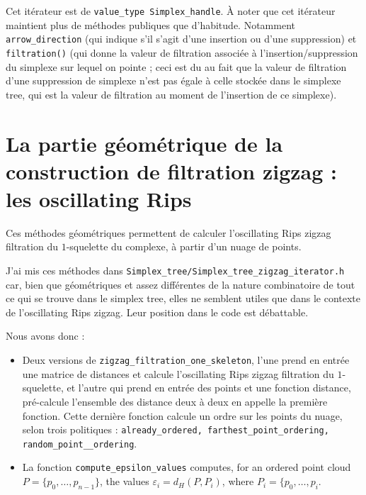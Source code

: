 \documentclass[11pt]{amsart}
\numberwithin{equation}{section}
\theoremstyle{plain}
\theoremstyle{definition}
\begin{document}
\begin{itemize}
\begin{itemize}
\smallskip

Cet itérateur est de {\tt value\_type Simplex\_handle}. À noter que cet itérateur maintient plus de méthodes publiques que d'habitude. Notamment {\tt arrow\_direction} (qui indique s'il s'agit d'une insertion ou d'une suppression) et {\tt filtration()} (qui donne la valeur de filtration associée à l'insertion/suppression du simplexe sur lequel on pointe ; ceci est du au fait que la valeur de filtration d'une suppression de simplexe n'est pas égale à celle stockée dans le simplexe tree, qui est la valeur de filtration au moment de l'insertion de ce simplexe).

\end{itemize}







\section{La partie géométrique de la construction de filtration zigzag : les oscillating Rips}

Ces méthodes géométriques permettent de calculer l'oscillating Rips zigzag filtration du $1$-squelette du complexe, à partir d'un nuage de points. 

\begin{remarque}
J'ai mis ces méthodes dans {\tt Simplex\_tree/Simplex\_tree\_zigzag\_iterator.h} car, bien que géométriques et assez différentes de la nature combinatoire de tout ce qui se trouve dans le simplex tree, elles ne semblent utiles que dans le contexte de l'oscillating Rips zigzag. Leur position dans le code est débattable.  
\end{remarque}

Nous avons donc :

\begin{itemize}
\item Deux versions de {\tt zigzag_filtration_one_skeleton}, l'une prend en entrée une matrice de distances et calcule l'oscillating Rips zigzag filtration du $1$-squelette, et l'autre qui prend en entrée des points et une fonction distance, pré-calcule l'ensemble des distance deux à deux en appelle la première fonction. Cette dernière fonction calcule un ordre sur les points du nuage, selon trois politiques : {\tt already\_ordered, farthest\_point\_ordering, random\_point_\_ordering}.
%
\item La fonction {\tt compute\_epsilon\_values} computes, for an ordered point cloud $P = \{p_0, \ldots ,p_{n-1}\}$, the values $\varepsilon_i = d_H(P, P_i)$, where $P_i = \{p_0, \ldots , p_i$.
\end{itemize}




\end{itemize}
\end{document}
